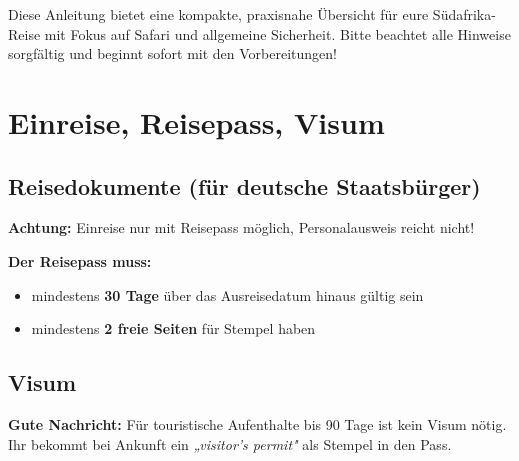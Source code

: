 \documentclass[12pt,a4paper]{article}
\begin{document}
\newpage
\tableofcontents
\newpage

\begin{infobox}[title={\faInfoCircle \hspace{0.2cm} Wichtiger Hinweis}]
Diese Anleitung bietet eine kompakte, praxisnahe Übersicht für eure Südafrika-Reise mit Fokus auf Safari und allgemeine Sicherheit. Bitte beachtet alle Hinweise sorgfältig und beginnt sofort mit den Vorbereitungen!
\end{infobox}

\vspace{0.5cm}

\section{Einreise, Reisepass, Visum}

\subsection{Reisedokumente (für deutsche Staatsbürger)}

\begin{warnbox}
\textbf{\faExclamationTriangle \hspace{0.2cm} Achtung:} Einreise nur mit Reisepass möglich, Personalausweis reicht nicht!\cite{auswaertiges-amt-1}
\end{warnbox}

\vspace{0.3cm}

\textbf{Der Reisepass muss:}
\begin{itemize}[leftmargin=*,label={\color{mainblue}\faCheckCircle}]
    \item mindestens \textbf{30 Tage} über das Ausreisedatum hinaus gültig sein
    \item mindestens \textbf{2 freie Seiten} für Stempel haben\cite{adac-einreise}
\end{itemize}

\subsection{Visum}

\begin{successbox}
\textbf{\faCheckDouble \hspace{0.2cm} Gute Nachricht:} Für touristische Aufenthalte bis 90 Tage ist kein Visum nötig. Ihr bekommt bei Ankunft ein \textit{„visitor's permit"} als Stempel in den Pass.\cite{erlebe-2}
\end{successbox}
\end{document}
